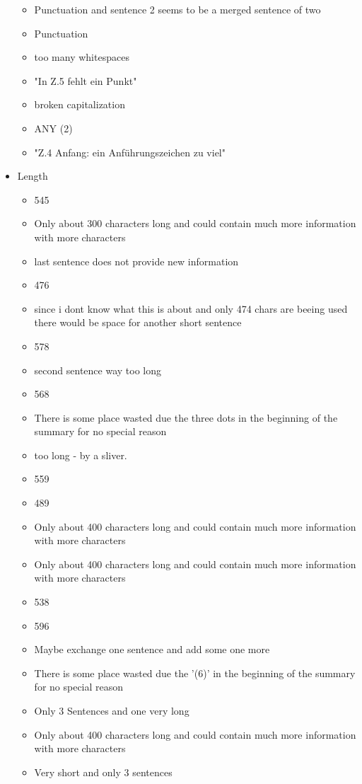 \begin{itemize}[topsep = 0pt, itemsep = 0pt]
\begin{itemize}[topsep = 0pt, itemsep = 0pt]
		\item Punctuation and sentence 2 seems to be a merged sentence of two
		\item Punctuation
		\item too many whitespaces
		\item "In Z.5 fehlt ein Punkt"
		\item broken capitalization
		\item ANY (2)
		\item "Z.4 Anfang: ein Anführungszeichen zu viel"
	\end{itemize}
	\item Length
	\begin{itemize}[topsep = 0pt, itemsep = 0pt]
		\item 545
		\item Only about 300 characters long and could contain much more information with more characters
		\item last sentence does not provide new information
		\item 476
		\item since i dont know what this is about and only 474 chars are beeing used there would be space for another short sentence
		\item 578
		\item second sentence way too long
		\item 568
		\item There is some place wasted due the three dots in the beginning of the summary for no special reason
		\item too long - by a sliver.
		\item 559
		\item 489
		\item Only about 400 characters long and could contain much more information with more characters
		\item Only about 400 characters long and could contain much more information with more characters
		\item 538
		\item 596
		\item Maybe exchange one sentence and add some one more
		\item There is some place wasted due the '(6)' in the beginning of the summary for no special reason
		\item Only 3 Sentences and one very long
		\item Only about 400 characters long and could contain much more information with more characters
		\item Very short and only 3 sentences

\end{itemize}
\end{itemize}

